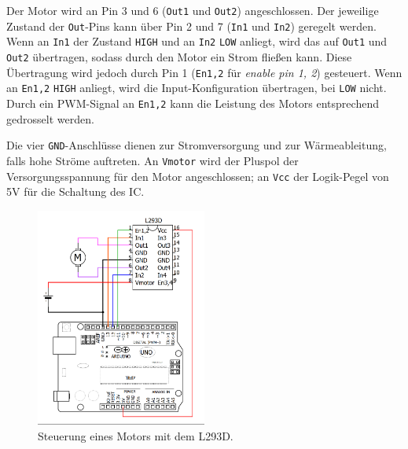 Der Motor wird an Pin 3 und 6 (\texttt{Out1} und \texttt{Out2}) angeschlossen. Der jeweilige Zustand der \texttt{Out}-Pins kann über Pin 2 und 7 (\texttt{In1} und \texttt{In2}) geregelt werden. Wenn an \texttt{In1} der Zustand \texttt{HIGH} und an \texttt{In2} \texttt{LOW} anliegt, wird das auf \texttt{Out1} und \texttt{Out2} übertragen, sodass durch den Motor ein Strom fließen kann. Diese Übertragung wird jedoch durch Pin 1 (\texttt{En1,2} für \emph{enable pin 1, 2}) gesteuert. Wenn an \texttt{En1,2} \texttt{HIGH} anliegt, wird die Input-Konfiguration übertragen, bei \texttt{LOW} nicht. Durch ein PWM-Signal an \texttt{En1,2} kann die Leistung des Motors entsprechend gedrosselt werden.

Die vier \texttt{GND}-Anschlüsse dienen zur Stromversorgung und zur Wärmeableitung, falls hohe Ströme auftreten. An \texttt{Vmotor} wird der Pluspol der Versorgungsspannung für den Motor angeschlossen; an \texttt{Vcc} der Logik-Pegel von 5V für die Schaltung des IC.

\begin{figure}[H]
	\centering
	\includegraphics[width=0.5\textwidth]{./Zeichnungen/l293d-an-arduino.png}
	\caption{Steuerung eines Motors mit dem L293D.}
	\label{abb:l293d-an-arduino}
\end{figure}


